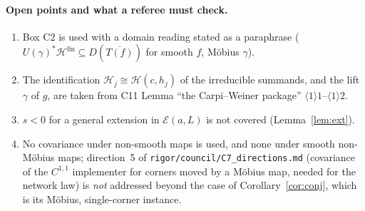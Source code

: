 \documentclass[11pt]{article}
\newcommand{\Hil}{\mathcal H}
\newcommand{\Hfin}{\Hil^{\mathrm{fin}}}
\begin{document}
\paragraph{Open points and what a referee must check.}
\begin{enumerate}[leftmargin=1.6em]
\item Box C2 is used with a domain reading stated as a paraphrase ($U(\gamma)^*\Hfin\subseteq D(\overline{T(f)})$ for
 smooth $f$, Möbius $\gamma$).
\item The identification $\Hil_j\cong\Hil(c,h_j)$ of the irreducible summands, and the lift $\gamma$ of $g$, are taken
 from C11 Lemma ``the Carpi--Weiner package'' $\langle1\rangle1$--$\langle1\rangle2$.
\item $s<0$ for a general extension in $\mathcal E(a,L)$ is not covered (Lemma~\ref{lem:ext}).
\item No covariance under non-smooth maps is used, and none under smooth non-Möbius maps; direction~5 of
 \texttt{rigor/council/C7\_directions.md} (covariance of the $C^{1,1}$ implementer for corners moved by a Möbius map,
 needed for the network law) is \emph{not} addressed beyond the case of Corollary~\ref{cor:conj}, which is its Möbius,
 single-corner instance.
\end{enumerate}
\end{document}
